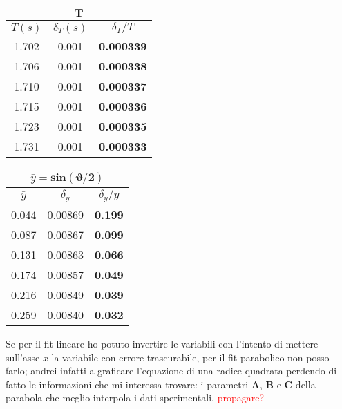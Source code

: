 \documentclass{article}
\begin{document}
	
	\begin{minipage}{0.5\textwidth}
		\begin{table}[H]
			\centering
			\begin{tabular}{@{}ccc@{}}
				\multicolumn{3}{c}{$\mathbf{T}$} \\ \midrule
				$T(s)$ & $\delta_T (s)$ & $\delta_T / T$ \\ \midrule
				1.702 & 0.001 & \textbf{0.000339} \\
				1.706 & 0.001 & \textbf{0.000338} \\
				1.710 & 0.001 & \textbf{0.000337} \\
				1.715 & 0.001 & \textbf{0.000336} \\
				1.723 & 0.001 & \textbf{0.000335} \\
				1.731 & 0.001 & \textbf{0.000333}  \\ \bottomrule   
			\end{tabular}
		\end{table}
	\end{minipage}
	\begin{minipage}{0.5\textwidth}
		\begin{table}[H]
			\centering
			\begin{tabular}{@{}ccc@{}}
				
				\multicolumn{3}{c}{$\bar{y} = \mathbf{sin{\left(\vartheta/2\right)}}$} \\ \midrule
				$\bar{y}$ & $\delta_{\bar{y}}$ & $\delta_{\bar{y}} / \bar{y}$ \\ \midrule
				0.044 & 0.00869 & \textbf{0.199} \\
				0.087 & 0.00867 & \textbf{0.099} \\
				0.131 & 0.00863 & \textbf{0.066} \\
				0.174 & 0.00857 & \textbf{0.049} \\
				0.216 & 0.00849 & \textbf{0.039} \\
				0.259 & 0.00840 & \textbf{0.032}  \\ \bottomrule  
			\end{tabular}
		\end{table}
	\end{minipage}
	\vspace{1cm}
	
	
	\noindent
	Se per il fit lineare ho potuto invertire le variabili con l'intento di mettere sull'asse $x$ la variabile con errore trascurabile, per il fit parabolico non posso farlo; andrei infatti a graficare l'equazione di una radice quadrata perdendo di fatto le informazioni che mi interessa trovare: i parametri \textbf{A}, \textbf{B} e \textbf{C} della parabola che meglio interpola i dati sperimentali. \textcolor{red}{propagare?}
	
\end{document}
